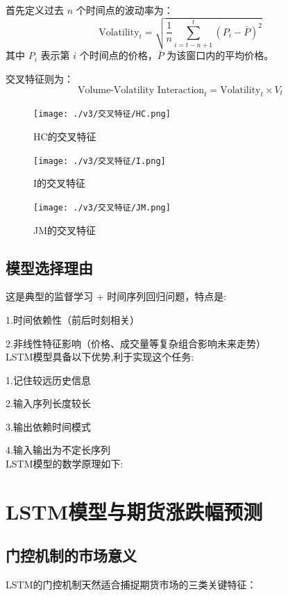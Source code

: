 \documentclass[a4paper,11pt]{ctexart}
\begin{document}
首先定义过去 $n$ 个时间点的波动率为：
\[
\text{Volatility}_t = \sqrt{\frac{1}{n} \sum_{i=t-n+1}^{t} (P_i - \bar{P})^2}
\]
其中 $P_i$ 表示第 $i$ 个时间点的价格，$\bar{P}$ 为该窗口内的平均价格。

交叉特征则为：
\[
\text{Volume-Volatility Interaction}_t = \text{Volatility}_t \times V_t
\]
\FloatBarrier
\noindent
  \begin{figure}[H]
  \centering

    \texttt{[image: ./v3/交叉特征/HC.png]}
    \caption*{HC的交叉特征}
  \end{figure}
  \begin{figure}[H]
    \centering
    \texttt{[image: ./v3/交叉特征/I.png]}
    \caption*{I的交叉特征}
  \end{figure}
  \begin{figure}[H]
    \centering
    \texttt{[image: ./v3/交叉特征/JM.png]}
    \caption*{JM的交叉特征}
 
  \end{figure}



\subsection{模型选择理由}

这是典型的监督学习 + 时间序列回归问题，特点是:

1.时间依赖性（前后时刻相关）

2.非线性特征影响（价格、成交量等复杂组合影响未来走势）\\

LSTM模型具备以下优势,利于实现这个任务:

1.记住较远历史信息

2.输入序列长度较长

3.输出依赖时间模式

4.输入输出为不定长序列\\

LSTM模型的数学原理如下:

\section*{LSTM模型与期货涨跌幅预测}
\subsection*{门控机制的市场意义}
LSTM的门控机制天然适合捕捉期货市场的三类关键特征：
\end{document}
